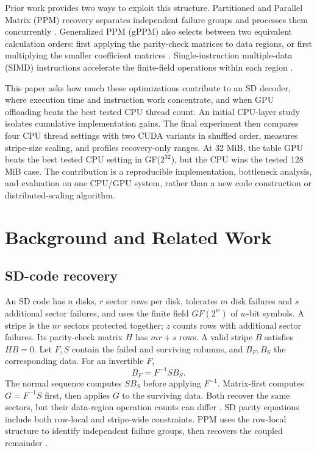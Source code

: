 \documentclass[conference]{IEEEtran}
\begin{document}
Prior work provides two ways to exploit this structure. Partitioned and Parallel Matrix (PPM) recovery separates independent failure groups and processes them concurrently \cite{li2015ppm}. Generalized PPM (gPPM) also selects between two equivalent calculation orders: first applying the parity-check matrices to data regions, or first multiplying the smaller coefficient matrices \cite{li2023gppm}. Single-instruction multiple-data (SIMD) instructions accelerate the finite-field operations within each region \cite{plank2013simd}.

This paper asks how much these optimizations contribute to an SD decoder, where execution time and instruction work concentrate, and when GPU offloading beats the best tested CPU thread count. An initial CPU-layer study isolates cumulative implementation gains. The final experiment then compares four CPU thread settings with two CUDA variants in shuffled order, measures stripe-size scaling, and profiles recovery-only ranges. At 32 MiB, the table GPU beats the best tested CPU setting in GF($2^{32}$), but the CPU wins the tested 128 MiB case. The contribution is a reproducible implementation, bottleneck analysis, and evaluation on one CPU/GPU system, rather than a new code construction or distributed-scaling algorithm.

\section{Background and Related Work}
\subsection{SD-code recovery}
An SD code has $n$ disks, $r$ sector rows per disk, tolerates $m$ disk failures and $s$ additional sector failures, and uses the finite field $GF(2^w)$ of $w$-bit symbols. A stripe is the $nr$ sectors protected together; $z$ counts rows with additional sector failures. Its parity-check matrix $H$ has $mr+s$ rows. A valid stripe $B$ satisfies $HB=0$. Let $F,S$ contain the failed and surviving columns, and $B_F,B_S$ the corresponding data. For an invertible $F$,
\begin{equation}
B_F = F^{-1} S B_S.
\label{eq:recover}
\end{equation}
The normal sequence computes $S B_S$ before applying $F^{-1}$. Matrix-first computes $G=F^{-1}S$ first, then applies $G$ to the surviving data. Both recover the same sectors, but their data-region operation counts can differ \cite{li2023gppm}. SD parity equations include both row-local and stripe-wide constraints. PPM uses the row-local structure to identify independent failure groups, then recovers the coupled remainder \cite{li2015ppm}.
\end{document}
